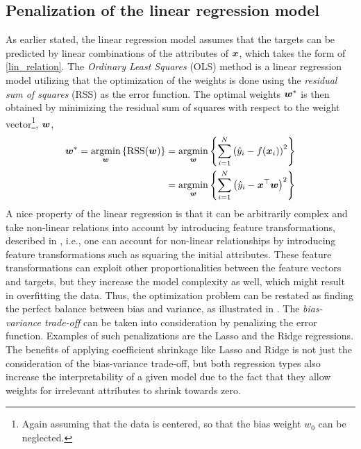 \subsection{Penalization of the linear regression model}\label{sec:linmodel}
As earlier stated, the linear regression model assumes that the targets can be predicted by linear combinations of the attributes of $\bm{x}$, which takes the form of \eqref{lin_relation}.   
The \emph{Ordinary Least Squares} (OLS) method is a linear regression model utilizing that the optimization of the weights is done using the \emph{residual sum of squares} (RSS) as the error function. The optimal weights $\boldsymbol{w}^*$ is then obtained by minimizing the residual sum of squares with respect to the weight vector\footnote{Again assuming that the data is centered, so that the bias weight $w_0$ can be neglected.}, $\boldsymbol{w}$, \begin{equation}\label{eq:ordinary_least_squares}
    \begin{split}
    \boldsymbol{w}^{*} = \operatorname*{\arg\!\min}_{\boldsymbol{w}} \left\{\mathrm{RSS}\qty(\boldsymbol{w}) \right\} &= \operatorname*{\arg\!\min}_{\boldsymbol{w}} \left\{ \sum_{i=1}^{N} \qty(\hat{y}_i - f\qty(\bm{x}_i))^2 \right\}\\
    &=\operatorname*{\arg\!\min}_{\boldsymbol{w}} \left\{ \sum_{i=1}^{N} \qty( \hat{y}_i - \bm{x}^{\top} \boldsymbol{w})^2 \right\}
    \end{split}
\end{equation}
A nice property of the linear regression is that it can be arbitrarily complex and take non-linear relations into account by introducing feature transformations, described in , i.e., one can account for non-linear relationships by introducing feature transformations such as squaring the initial attributes. These feature transformations can exploit other proportionalities between the feature vectors and targets, but they increase the model complexity  as well, which might result in overfitting the data. Thus, the optimization problem can be restated as finding the perfect balance between bias and variance, as illustrated in . The \emph{bias-variance trade-off} can be taken into consideration by penalizing the error function. Examples of such penalizations are the Lasso and the Ridge regressions. The benefits of applying coefficient shrinkage like Lasso and Ridge is not just the consideration of the bias-variance trade-off, but both regression types also increase the interpretability of a given model due to the fact that they allow weights for irrelevant attributes to shrink towards zero.

